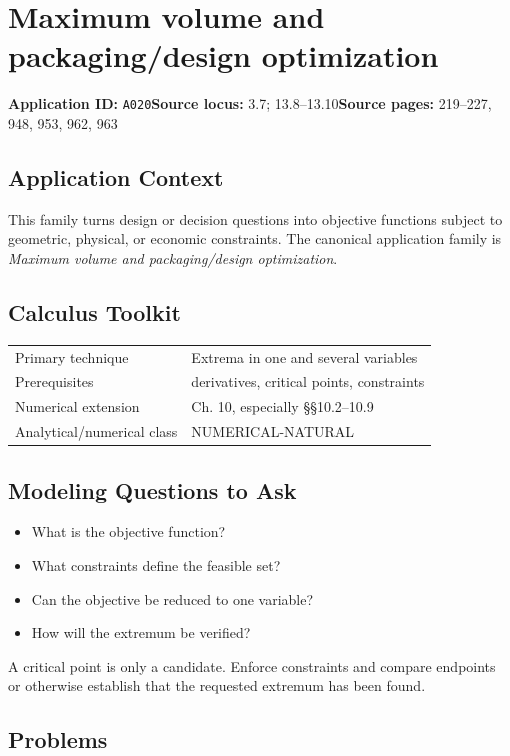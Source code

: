 \documentclass[11pt]{book}
\newcommand{\pid}[1]{\texttt{#1}}
\begin{document}
\chapter{Maximum volume and packaging/design optimization}\label{app:A020}
\textbf{Application ID:} \pid{A020}\quad \textbf{Source locus:} 3.7; 13.8–13.10\quad \textbf{Source pages:} 219–227, 948, 953, 962, 963
\section*{Application Context}
This family turns design or decision questions into objective functions subject to geometric, physical, or economic constraints. The canonical application family is \emph{Maximum volume and packaging/design optimization}.
\section*{Calculus Toolkit}
\begin{tabularx}{\textwidth}{@{}lX@{}}\toprule
Primary technique & Extrema in one and several variables \\
Prerequisites & derivatives, critical points, constraints \\
Numerical extension & Ch. 10, especially §§10.2–10.9 \\
Analytical/numerical class & NUMERICAL-NATURAL \\
\bottomrule\end{tabularx}
\section*{Modeling Questions to Ask}\begin{itemize}
\item What is the objective function?
\item What constraints define the feasible set?
\item Can the objective be reduced to one variable?
\item How will the extremum be verified?
\end{itemize}
\begin{errorbox}A critical point is only a candidate. Enforce constraints and compare endpoints or otherwise establish that the requested extremum has been found.\end{errorbox}
\section*{Problems}
\end{document}
